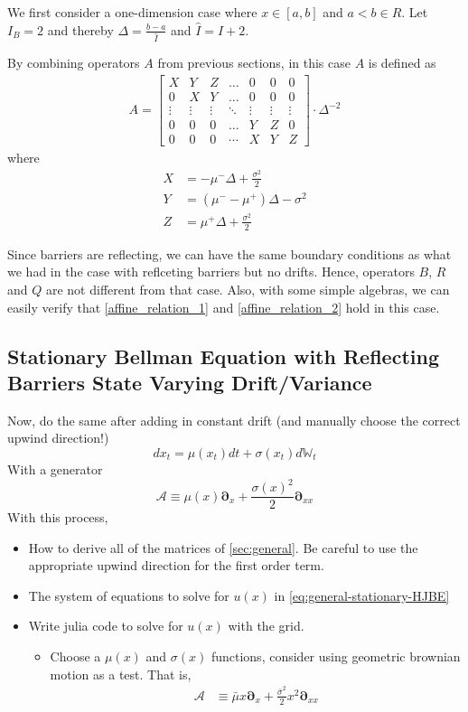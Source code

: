 \documentclass[11pt]{article}
\newcommand{\D}[1][]{\ensuremath{\boldsymbol{\partial}_{#1}}}
\newcommand{\W}{\ensuremath{\mathbb{W}}}
\newcommand{\A}{\ensuremath{\mathcal{A}}}
\begin{document}
We first consider a one-dimension case where $x\in [a, b]$ and $a<b\in R$. Let $I_B = 2$ and thereby $\Delta  = \frac{b-a}{\hat{I}}$ and $\hat{I} = I+2$. 

By combining operators $A$ from previous sections, in this case $A$ is defined as
\begin{align}
A = \begin{bmatrix}
X&Y&Z&\dots&0&0&0\\
0&X&Y&\dots&0&0&0\\
\vdots&\vdots&\vdots&\ddots&\vdots&\vdots&\vdots\\
0&0&0&\dots&Y&Z&0\\
0&0&0&\cdots&X&Y&Z
\end{bmatrix}\cdot \Delta^{-2}\nonumber
\end{align}
where
\begin{align*}
X &= -\mu^-\Delta+\frac{\sigma^2}{2}\\
Y &= (\mu^--\mu^+)\Delta-\sigma^2\\
Z &=\mu^+\Delta+\frac{\sigma^2}{2}
\end{align*}

Since barriers are reflecting, we can have the same boundary conditions as what we had in the case with reflceting barriers but no drifts. Hence, operators $B$, $R$ and $Q$ are not different from that case. Also, with some simple algebras, we can easily verify that \eqref{affine_relation_1} and \eqref{affine_relation_2} hold in this case.


\subsection{Stationary Bellman Equation with Reflecting Barriers State Varying Drift/Variance}
Now, do the same after adding in constant drift (and manually choose the correct upwind direction!)
$$
d x_t = \mu(x_t) dt + \sigma(x_t) d\W_t
$$
With a generator
$$
\A \equiv \mu(x) \D[x] + \frac{\sigma(x)^2}{2}\D[xx]
$$
With this process,
\begin{itemize}
	\item How to derive all of the matrices of \cref{sec:general}.  Be careful to use the appropriate upwind direction for the first order term.
	\item The system of equations to solve for $u(x)$ in \cref{eq:general-stationary-HJBE}
	\item Write julia code to solve for $u(x)$ with the grid.
	\begin{itemize}
		\item Choose a $\mu(x)$ and $\sigma(x)$ functions, consider using geometric brownian motion as a test.  That is,
		\begin{align}
			\A &\equiv \bar{\mu} x \D[x] + \frac{\bar{\sigma}^2}{2}x^2\D[xx]
		\end{align}
	\end{itemize}
\end{itemize}
\end{document}
